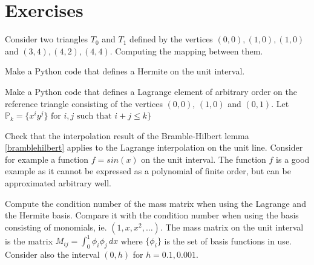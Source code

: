 \section{Exercises}


\begin{exercise}
Consider two triangles $T_0$ and $T_1$ defined by the vertices $(0,0), (1,0), (1,0)$ and
$(3,4), (4,2), (4,4)$. Computing the mapping between them.  
\end{exercise}


\begin{exercise}
\label{hermite:interval}
Make a Python code that defines a Hermite on the unit interval.       
\end{exercise}



\begin{exercise}
\label{lagrange:triangle}
Make a Python code that defines a Lagrange element of arbitrary order on the reference triangle 
consisting of the vertices $(0,0)$, $(1,0)$ and $(0,1)$. Let $\mathbb{P}_k = \{ x^i y^j \} \mbox{ for } i,j \mbox{ such that } i+j \le k\} $     
\end{exercise}

\begin{exercise}
Check that the interpolation result
of the Bramble-Hilbert lemma \ref{bramblehilbert} applies to the Lagrange interpolation on the unit line. Consider 
for example a function $f = sin(x)$ on the unit interval. The function $f$ is a good example as it cannot be expressed 
as a polynomial of finite order, but can be approximated arbitrary well. 
\end{exercise}

\begin{exercise}
Compute the condition number of the mass matrix when using the Lagrange and the Hermite basis. Compare it with the condition
number when using the basis consisting of monomials, ie. $(1, x, x^2, \ldots)$.   
	The mass matrix on the unit interval  is the matrix $M_{ij} = \int_0^1 \phi_i \phi_j \, dx $ where $\{\phi_i\}$ is 
	the set of basis functions in use. Consider also the interval $(0,h)$ for $h=0.1, 0.001$.  
\end{exercise}





